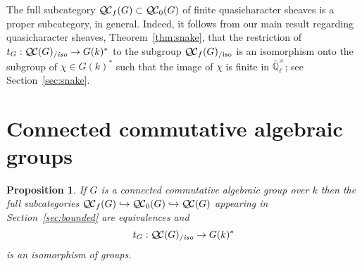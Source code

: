 \documentclass[11pt]{amsart}
\theoremstyle{plain}
\newtheorem{proposition}[theorem]{Proposition}
\theoremstyle{definition}
\theoremstyle{remark}
\newcommand{\EE}{\mathbb{\bar Q}_\ell}
\newcommand{\Fq}{k}
\newcommand{\EEx}{\EE^\times}
\newcommand{\QC}{{\mathcal{Q\hskip-0.8pt C}}}
\newcommand{\QCb}{{\QC_0}}
\newcommand{\QCf}{{\QC_f}}
\newcommand{\QCiso}[1]{\QC(#1)_{/\textit{iso}}}
\newcommand{\QCfiso}[1]{\QCf(#1)_{/\text{iso}}}
\newcommand{\trFrob}[1]{t_{#1}}
\begin{document}
The full subcategory $\QCf(G) \subset \QCb(G)$ of finite quasicharacter sheaves is a proper subcategory, in general. Indeed, it follows from our main result regarding quasicharacter sheaves, Theorem~\ref{thm:snake}, that the restriction of $\trFrob{G} : \QCiso{G} \to G(\Fq)^*$ to the subgroup $\QCfiso{G}$ is an isomorphism onto the subgroup of $\chi \in G(\Fq)^*$ such that the image of $\chi$ is finite in $\EEx$; see Section~\ref{sec:snake}.
 
\section{Connected commutative algebraic groups}

%

\begin{proposition}\label{prop:connected}
  If $G$ is a connected commutative algebraic group over $\Fq$ then 
  the full subcategories $\QCf(G) \hookrightarrow \QCb(G) \hookrightarrow \QC(G)$ 
  appearing in Section~\ref{sec:bounded} are equivalences 
  and
  \[
  \trFrob{G} : \QCiso{G} \to G(\Fq)^*
  \]
  is an isomorphism of groups.
\end{proposition}
\end{document}
